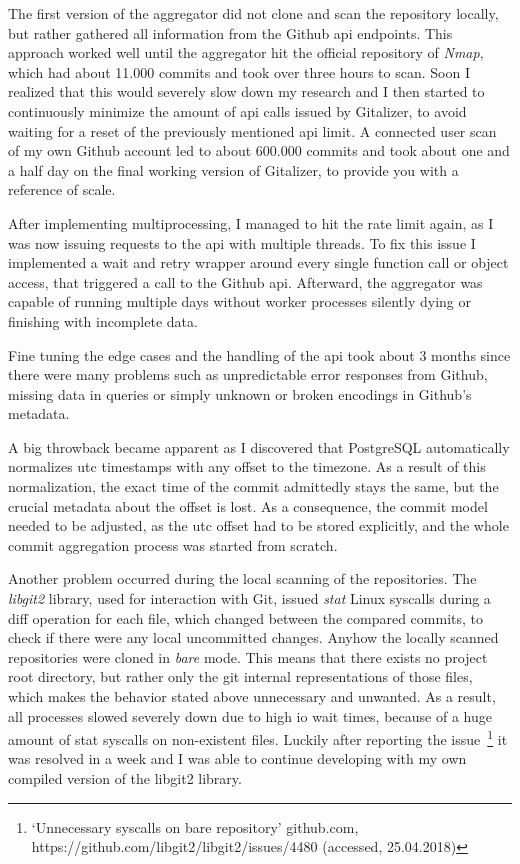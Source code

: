The first version of the aggregator did not clone and scan the repository locally, but rather gathered all information from the Github \ac{api} endpoints.
This approach worked well until the aggregator hit the official repository of \emph{Nmap}, which had about 11.000 commits and took over three hours to scan.
Soon I realized that this would severely slow down my research and I then started to continuously minimize the amount of \ac{api} calls issued by Gitalizer, to avoid waiting for a reset of the previously mentioned \ac{api} limit.
A connected user scan of my own Github account led to about 600.000 commits and took about one and a half day on the final working version of Gitalizer, to provide you with a reference of scale.

After implementing multiprocessing, I managed to hit the rate limit again, as I was now issuing requests to the \ac{api} with multiple threads.
To fix this issue I implemented a wait and retry wrapper around every single function call or object access, that triggered a call to the Github \ac{api}.
Afterward, the aggregator was capable of running multiple days without worker processes silently dying or finishing with incomplete data.

Fine tuning the edge cases and the handling of the \ac{api} took about 3 months since there were many problems such as unpredictable error responses from Github, missing data in queries or simply unknown or broken encodings in Github's metadata.

A big throwback became apparent as I discovered that PostgreSQL automatically normalizes \ac{utc} timestamps with any offset to the  timezone.
As a result of this normalization, the exact time of the commit admittedly stays the same, but the crucial metadata about the offset is lost.
As a consequence, the commit model needed to be adjusted, as the \ac{utc} offset had to be stored explicitly, and the whole commit aggregation process was started from scratch.

Another problem occurred during the local scanning of the repositories.
The \emph{libgit2} library, used for interaction with Git, issued \emph{stat} Linux syscalls during a diff operation for each file, which changed between the compared commits, to check if there were any local uncommitted changes.
Anyhow the locally scanned repositories were cloned in \emph{bare} mode.
This means that there exists no project root directory, but rather only the git internal representations of those files, which makes the behavior stated above unnecessary and unwanted.
As a result, all processes slowed severely down due to high \ac{io} wait times, because of a huge amount of stat syscalls on non-existent files.
Luckily after reporting the issue~\footnote{`Unnecessary syscalls on bare repository' github.com, https://github.com/libgit2/libgit2/issues/4480 (accessed, 25.04.2018)} it was resolved in a week and I was able to continue developing with my own compiled version of the libgit2 library.
